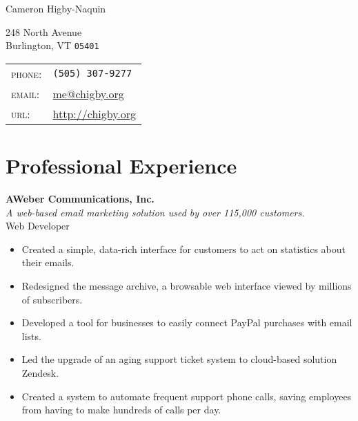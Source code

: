 \documentclass[10pt, a4paper]{article}
\newcommand{\years}[1]{\marginnote{\scriptsize #1}}
\begin{document}
{\LARGE Cameron Higby-Naquin}\\
\begin{multicols}{2}
248 North Avenue\\
Burlington, VT \texttt{05401}
\vfill
\columnbreak
\begin{tabular}{ll}
\textsc{phone}:&\texttt{(505) 307-9277}\\ %
\textsc{email}:&\href{mailto:me@chigby.org}{me@chigby.org}\\
\textsc{url}:&\href{http://chigby.org/}{http://chigby.org}\\
\end{tabular}
\end{multicols}

\section*{Professional Experience}
\noindent
\years{2009-2012}\textbf{AWeber Communications, Inc.}\\
\textit{A web-based email marketing solution used by over 115,000 customers.}\\
Web Developer
\begin{itemize}
\item Created a simple, data-rich interface for customers to act on statistics about their emails.
\item Redesigned the message archive, a browsable web interface viewed by millions of subscribers.
\item Developed a tool for businesses to easily connect PayPal purchases with email lists. %
\item Led the upgrade of an aging support ticket system to cloud-based solution Zendesk.
\item Created a system to automate frequent support phone calls, saving employees from having to make hundreds of calls per day.
\end{itemize}
\end{document}
